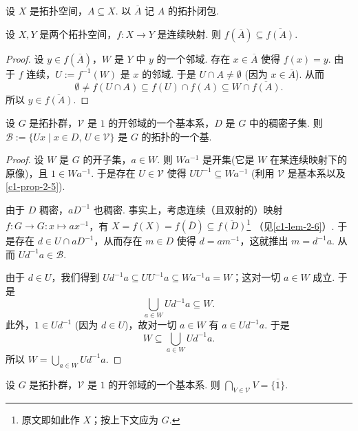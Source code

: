 \begin{notation}\label{c1-not-2-2}
设 $X$ 是拓扑空间，$A\subseteq X$. 以 $\overline{A}$ 记 $A$ 的拓扑闭包.
\end{notation}

\begin{lemma}\label{c1-lem-2-6}
设 $X,Y$ 是两个拓扑空间，$f:X\to Y$ 是连续映射. 则 $f(\overline{A})\subseteq \overline{f(A)}$.
\end{lemma}

\begin{proof}
设 $y\in f(\overline{A})$，$W$ 是 $Y$ 中 $y$ 的一个邻域. 存在 $x\in\overline{A}$ 使得 $f(x)=y$. 由于 $f$ 连续，$U:=f^{-1}(W)$ 是 $x$ 的邻域. 于是 $U\cap A\neq\emptyset$ (因为 $x\in\overline{A}$). 从而
\[
\emptyset\neq f(U\cap A)\subseteq f(U)\cap f(A)\subseteq W\cap \overline{f(A)}.
\]
所以 $y\in\overline{f(A)}$.
\end{proof}

\begin{proposition}\label{c1-prop-2-7}
设 $G$ 是拓扑群，$\mathcal{V}$ 是 $1$ 的开邻域的一个基本系，$D$ 是 $G$ 中的稠密子集. 则 $\mathcal{B}:=\{Ux\mid x\in D,\,U\in\mathcal{V}\}$ 是 $G$ 的拓扑的一个基.
\end{proposition}

\begin{proof}
设 $W$ 是 $G$ 的开子集，$a\in W$. 则 $Wa^{-1}$ 是开集(它是 $W$ 在某连续映射下的原像)，且 $1\in Wa^{-1}$. 于是存在 $U\in\mathcal{V}$ 使得 $UU^{-1}\subseteq Wa^{-1}$ (利用 $\mathcal{V}$ 是基本系以及\autoref{c1-prop-2-5}).

由于 $D$ 稠密，$aD^{-1}$ 也稠密. 事实上，考虑连续（且双射的）映射 $f:G\to G:x\mapsto ax^{-1}$，有 $X=f(X)=f(\overline{D})\subseteq\overline{f(D)}$\footnote{原文即如此作 $X$；按上下文应为 $G$.} （见\autoref{c1-lem-2-6}）. 于是存在 $d\in U\cap aD^{-1}$，从而存在 $m\in D$ 使得 $d=am^{-1}$，这就推出 $m=d^{-1}a$. 从而 $Ud^{-1}a\in\mathcal{B}$.

由于 $d\in U$，我们得到 $Ud^{-1}a\subseteq UU^{-1}a\subseteq Wa^{-1}a=W$；这对一切 $a\in W$ 成立. 于是
\[
\bigcup_{a\in W}Ud^{-1}a\subseteq W.
\]
此外，$1\in Ud^{-1}$ (因为 $d\in U$)，故对一切 $a\in W$ 有 $a\in Ud^{-1}a$. 于是
\[
W\subseteq\bigcup_{a\in W}Ud^{-1}a.
\]
所以 $W=\bigcup_{a\in W}Ud^{-1}a$.
\end{proof}

\begin{proposition}\label{c1-prop-2-8}
设 $G$ 是拓扑群，$\mathcal{V}$ 是 $1$ 的开邻域的一个基本系. 则 $\bigcap_{V\in\mathcal{V}}V=\overline{\{1\}}$.
\end{proposition}

